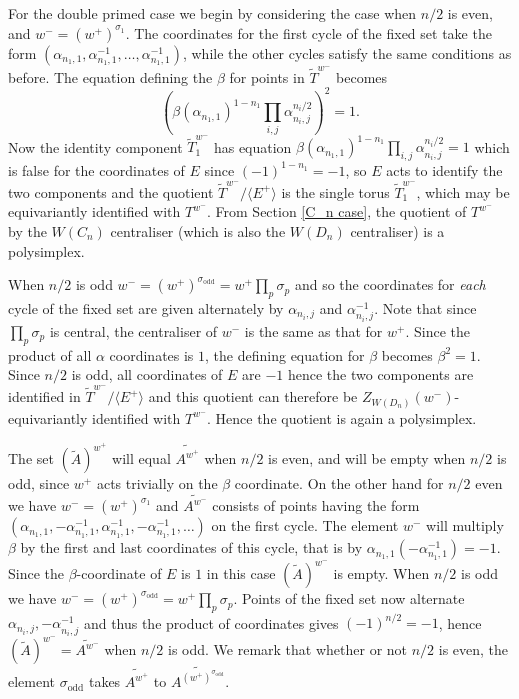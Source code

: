 \documentclass[11pt,a4paper]{article}
\def\Atilde{(\widetilde{A})}
\def\coveringtorus{\tilde{T}}
\def\odd{\mathrm{odd}}
\def\wplus{w^+}
\def\wminus{w^-}
\begin{document}
\bigskip

For the double primed case we begin by considering the case when $n/2$ is even, and $\wminus=(\wplus)^{\sigma_1}$. The coordinates for the first cycle of the fixed set take the form $(\alpha_{n_1,1},\alpha_{n_1,1}^{-1},\dots,\alpha_{n_1,1}^{-1})$, while the other cycles satisfy the same conditions as before. The equation defining the $\beta$ for points in $\coveringtorus^{\wminus}$ becomes 
\[
\left(\beta(\alpha_{n_1,1})^{1-n_1}\prod_{i,j} \alpha_{n_i,j}^{n_i/2}\right)^2=1.
\]
Now the identity component $\coveringtorus^{\wminus}_1$ has equation $\beta(\alpha_{n_1,1})^{1-n_1}\prod_{i,j} \alpha_{n_i,j}^{n_i/2}=1$ which is false for the coordinates of $E$ since $(-1)^{1-n_1}=-1$, so $E$ acts to identify the two components and the quotient $\coveringtorus^{\wminus}/\langle E^+\rangle$ is the single torus $\coveringtorus^{\wminus}_1$, which may be equivariantly identified with  $T^{\wminus}$. From Section \ref{C_n case}, the quotient of $T^{\wminus}$ by the $W(C_n)$ centraliser (which is also the $W(D_n)$ centraliser) is a polysimplex.

When $n/2$ is odd $\wminus=(\wplus)^{\sigma_\odd}=\wplus\prod_p\sigma_p$ and so the coordinates for \emph{each} cycle of the fixed set are given alternately by $\alpha_{n_i,j}$ and $\alpha_{n_i,j}^{-1}$. Note that since $\prod_p\sigma_p$ is central, the centraliser of $\wminus$ is the same as that for $\wplus$.  Since the product of all $\alpha$ coordinates is $1$, the defining equation for $\beta$ becomes $\beta^2=1$.  Since $n/2$ is odd, all coordinates of $E$ are $-1$ hence the two components are identified in $\coveringtorus^{\wminus}/\langle E^+\rangle$ and this quotient can therefore be $Z_{W(D_n)}(\wminus)$-equivariantly identified with $T^{\wminus}$.  Hence the quotient is again a polysimplex.


\bigskip


The set $\Atilde^{\wplus}$ will equal $\widetilde{A^{\wplus}}$ when $n/2$ is even, and will be empty when $n/2$ is odd, since $\wplus$ acts trivially on the $\beta$ coordinate. On the other hand for $n/2$ even we have $\wminus=(\wplus)^{\sigma_1}$ and $\widetilde{A^{\wminus}}$ consists of points having the form $(\alpha_{n_1,1},-\alpha_{n_1,1}^{-1},\alpha_{n_1,1}^{-1},-\alpha_{n_1,1}^{-1},\dots)$ on the first cycle. The element $\wminus$ will multiply $\beta$ by the first and last coordinates of this cycle, that is by $\alpha_{n_1,1}(-\alpha_{n_1,1}^{-1})=-1$. Since the $\beta$-coordinate of $E$ is $1$ in this case $\Atilde^{\wminus}$ is empty.  When $n/2$ is odd we have $\wminus=(\wplus)^{\sigma_\odd}=\wplus\prod_p\sigma_p$. Points of the fixed set now alternate $\alpha_{n_i,j},-\alpha_{n_i,j}^{-1}$ and thus the product of coordinates gives $(-1)^{n/2}=-1$, hence $\Atilde^{\wminus}=\widetilde{A^{\wminus}}$ when $n/2$ is odd.  We remark that whether or not $n/2$ is even, the element $\sigma_\odd$ takes $\widetilde{A^{\wplus}}$ to $\widetilde{A^{(\wplus)^{\sigma_\odd}}}$.
\end{document}
